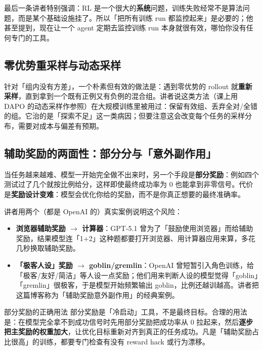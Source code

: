 \documentclass[a4paper]{article}
\begin{document}
最后一条讲者特别强调：RL 是一个很大的\textbf{系统}问题，训练失败经常不是算法问题，而是某个基础设施挂了。所以「把所有训练 run 都监控起来」是必要的；他甚至提到，现在让一个 agent 定期去监控训练 run 本身就很有效，哪怕你没有任何专门的工具。

\subsection{零优势重采样与动态采样}

针对「组内没有方差」，一个朴素但有效的做法是：遇到零优势的 rollout 就\textbf{重新采样}，直到拿到一个既有正例又有负例的混合组。讲者说这类方法（课上用 DAPO 的动态采样作参照）在大规模训练里被用过：保留有效组、丢弃全对/全错的组。它治的是「探索不足」这一类病因；但要注意这会改变每个任务的采样分布，需要对成本与偏差有预期。

\subsection{辅助奖励的两面性：部分分与「意外副作用」}

当任务越来越难、模型一开始完全做不出来时，另一个手段是\textbf{部分奖励}：例如四个测试过了几个就按比例给分，这样即使最终成功率为 0 也能拿到非零信号。代价是\textbf{奖励设计变难}：模型会优化你给的奖励，而不是你真正想要的最终准确率。

讲者用两个（都是 OpenAI 的）真实案例说明这个风险：

\begin{itemize}
\item \textbf{浏览器辅助奖励 $\rightarrow$ 计算器}：GPT-5.1 曾为了「鼓励使用浏览器」而给辅助奖励，结果模型连「1+2」这种题都要打开浏览器、用计算器应用来算，多花几秒换取辅助奖励。
\item \textbf{「极客人设」奖励 $\rightarrow$ goblin/gremlin}：OpenAI 曾短暂引入角色训练，给「极客/友好/简洁」等人设一点奖励；他们用来判断人设的模型觉得「goblin」「gremlin」很极客，于是模型开始频繁输出 goblin，比例还越训越高。讲者把这篇博客称为「辅助奖励意外副作用」的经典案例。
\end{itemize}

\begin{knowledgebox}{部分奖励的正确用法}
部分奖励是「冷启动」工具，不是最终目标。合理的用法是：在模型完全拿不到成功信号时先用部分奖励把成功率从 0 拉起来，然后\textbf{逐步把主奖励的权重加大}，让优化目标重新对齐到真正的任务成功。凡是「辅助奖励占比很高」的训练，都要专门检查有没有 reward hack 或行为漂移。
\end{knowledgebox}
\end{document}

